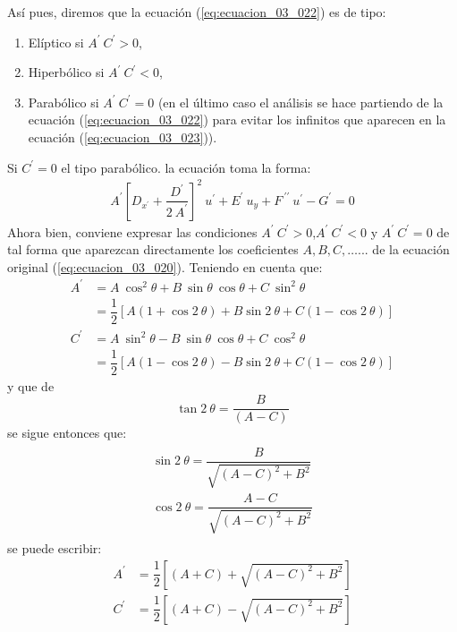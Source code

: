 Así pues, diremos que la ecuación (\ref{eq:ecuacion_03_022}) es de tipo:
\begin{enumerate}
\item Elíptico si $A^{\prime} \: C^{\prime} > 0$,
\item Hiperbólico si $A^{\prime} \: C^{\prime} < 0$, 
\item Parabólico si $A^{\prime} \: C^{\prime} = 0$ (en el último caso el análisis se hace partiendo de la ecuación (\ref{eq:ecuacion_03_022}) para evitar los infinitos que aparecen en la ecuación (\ref{eq:ecuacion_03_023})). 
\end{enumerate}
Si $C^{\prime} = 0$ el tipo parabólico. la ecuación toma la forma:
\begin{align*}
A^{\prime} \left[ D_{x^\prime} + \dfrac{D^{\prime}}{2 \: A^{\prime}} \right]^{2} \: u^{\prime} + E^{\prime} \: u_{y} + F^{\: \prime \prime} \: u^{\prime} - G^{\prime} = 0
\end{align*}
Ahora bien, conviene expresar las condiciones $A^{\prime} \: C^{\prime} > 0$,$A^{\prime} \: C^{\prime} < 0$ y $A^{\prime} \: C^{\prime} = 0$ de tal forma que aparezcan directamente los coeficientes $A, B, C, \ldots . . .$ de la ecuación original (\ref{eq:ecuacion_03_020}). Teniendo en cuenta que:
\begin{align*}
A^{\prime} &= A \: \cos^{2} \theta + B \: \sin \theta \: \cos \theta + C \: \sin^{2} \theta \\
&= \dfrac{1}{2} [ A (1 + \cos 2 \: \theta) + B \sin 2 \: \theta +  C (1 - \cos 2 \: \theta)] \\[1em]
C^{\prime} &= A \: \sin^{2} \theta - B \: \sin \theta \: \cos \theta + C \: \cos^{2} \theta \\
&= \dfrac{1}{2} [ A (1 - \cos 2 \: \theta) - B \sin 2 \: \theta +  C (1 - \cos 2 \: \theta)]
\end{align*}
y que de
\[ \tan 2 \: \theta = \dfrac{B}{(A - C)} \]
se sigue entonces que:
\begin{align}
\begin{aligned}
\sin 2 \: \theta = \dfrac{B}{\sqrt{(A - C)^{2} + B^{2}}} \\
\cos 2 \: \theta = \dfrac{A - C}{\sqrt{(A - C)^{2} + B^{2}}}
\end{aligned}
\label{eq:ecuacion_03_024}
\end{align}
se puede escribir:
\begin{align*}
A^{\prime} &= \dfrac{1}{2} {\left[ (A+ C) +  \sqrt{(A - C)^{2} + B^{2}} \right]} \\
C^{\prime} &= \dfrac{1}{2} {\left[ (A+ C) -  \sqrt{(A - C)^{2} + B^{2}} \right]}
\end{align*}

